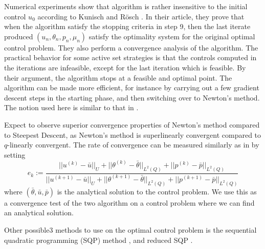 Numerical experiments show that algorithm is rather insensitive to the initial control $u_0$  according to Kunisch and Rösch \cite{primal_dual}. In their article, they prove that when the algorithm satisfy the stopping criteria in step 9, then the last iterate produced $(u_n, \theta_n, p_n, \mu_n)$ satisfy the optimality system for the original optimal control problem. They also perform a convergence analysis of the algorithm. The practical behavior for some active set strategies is that the controls computed in the iterations are infeasible, except for the last iteration which is feasible. By their argument, the algorithm stops at a feasible and optimal point. The algorithm can be made more efficient, for instance by carrying out a few gradient descent steps in the starting phase, and then switching over to Newton's method. The notion used here is similar to that in \cite{Algorithms}.

Expect to observe superior convergence properties of Newton's method compared to Steepest Descent, as Newton's method is superlinearly convergent compared to $q$-linearly convergent. The rate of convergence can be measured similarly as in \cite{DPSteel} by setting 
\begin{equation}
    \label{eq:rate_of_conv}
    e_k := \frac{||u^{(k)}-\bar{u}||_U + ||\theta^{(k)}-\bar{\theta}||_{L^2(Q)} +||p^{(k)}-\bar{p}||_{L^2(Q)} }{||u^{(k+1)}-\bar{u}||_U + ||\theta^{(k+1)}-\bar{\theta}||_{L^2(Q)} +||p^{(k+1)}-\bar{p}||_{L^2(Q)}}
\end{equation}
where $(\bar{\theta},\bar{u},\bar{p})$ is the analytical solution to the control problem. We use this as a convergence test of the two algorithm on a control problem where we can find an analytical solution. 

Other possible3 methods to use on the optimal control problem is the sequential quadratic programming (SQP) method \cite{Algorithms}, and reduced SQP \cite{DPSteel}. 
